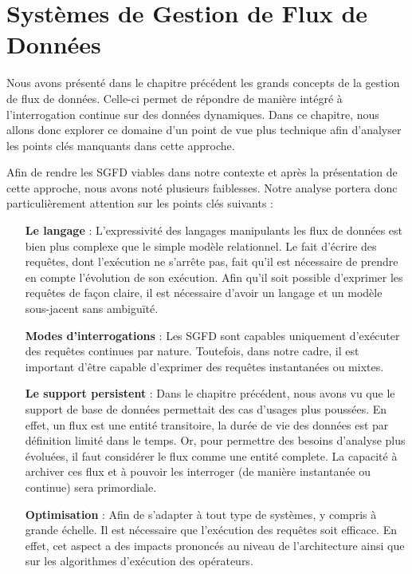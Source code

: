 \chapter{Systèmes de Gestion de Flux de Données}
\chaptertoc
Nous avons présenté dans le chapitre précédent les grands concepts de la gestion de flux de données. Celle-ci permet de répondre de manière intégré à l'interrogation continue sur des données dynamiques. Dans ce chapitre, nous allons donc explorer ce domaine d'un point de vue plus technique afin d'analyser les points clés manquants dans cette approche.

Afin de rendre les SGFD viables dans notre contexte et après la présentation de cette approche, nous avons noté plusieurs faiblesses. Notre analyse portera donc particulièrement attention sur les points clés suivants : 
\begin{itemize}
	\item[\textbf{Le langage}] : L'expressivité des langages manipulants les flux de données est bien plus complexe que le simple modèle relationnel. Le fait d'écrire des requêtes, dont l'exécution ne s'arrête pas, fait qu'il est nécessaire de prendre en compte l'évolution de son exécution. Afin qu'il soit possible d'exprimer les requêtes de façon claire, il est nécessaire d'avoir un langage et un modèle sous-jacent sans ambiguïté.
	\item[\textbf{Modes d'interrogations}] : Les SGFD sont capables uniquement d'exécuter des requêtes continues par nature. Toutefois, dans notre cadre, il est important d'être capable d'exprimer des requêtes instantanées ou mixtes. 
	\item[\textbf{Le support persistent}] : Dans le chapitre précédent, nous avons vu que le support de base de données permettait des cas d'usages plus poussées. En effet, un flux est une entité transitoire, la durée de vie des données est par définition limité dans le temps. Or, pour permettre des besoins d'analyse plus évoluées, il faut considérer le flux comme une entité complete. La capacité à archiver ces flux et à pouvoir les interroger (de manière instantanée ou continue) sera primordiale.
	\item[\textbf{Optimisation}] : Afin de s'adapter à tout type de systèmes, y compris à grande échelle. Il est nécessaire que l'exécution des requêtes soit efficace. En effet, cet aspect a des impacts prononcés au niveau de l'architecture ainsi que sur les algorithmes d'exécution des opérateurs.
\end{itemize}

